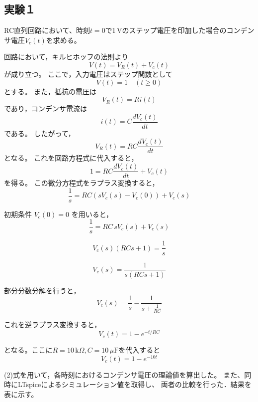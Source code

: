 \documentclass{jarticle}
\begin{document}
\subsection{実験１}

RC直列回路において、時刻$t=0$で1\,Vのステップ電圧を印加した場合のコンデンサ電圧$V_c(t)$を求める。

回路において，キルヒホッフの法則より
\[
V(t) = V_R(t) + V_c(t)
\]
が成り立つ。
ここで，入力電圧はステップ関数として
\[
V(t) = 1 \quad (t \geq 0)
\]
とする。
また，抵抗の電圧は
\[
V_R(t) = R i(t)
\]
であり，コンデンサ電流は
\[
i(t) = C \frac{dV_c(t)}{dt}
\]
である。
したがって，
\[
V_R(t) = RC \frac{dV_c(t)}{dt}
\]
となる。
これを回路方程式に代入すると，
\[
1 = RC \frac{dV_c(t)}{dt} + V_c(t)
\]
を得る。
この微分方程式をラプラス変換すると，
\[
\frac{1}{s} = RC \left(sV_c(s) - V_c(0)\right) + V_c(s)
\]

初期条件 $V_c(0)=0$ を用いると，
\[
\frac{1}{s} = RC \, s V_c(s) + V_c(s)
\]

\[
V_c(s)\left(RC s + 1\right) = \frac{1}{s}
\]

\[
V_c(s) = \frac{1}{s(RC s + 1)}
\]

部分分数分解を行うと，
\[
V_c(s) = \frac{1}{s} - \frac{1}{s + \frac{1}{RC}}
\]

これを逆ラプラス変換すると，
\[
V_c(t) = 1 - e^{-t/RC}
\]

となる。ここに$R = 10\,\text{k}\Omega, C = 10\,\mu\text{F}$を代入すると
\begin{equation}
V_c(t) = 1 - e^{-10t}    
\end{equation}

(2)式を用いて，各時刻におけるコンデンサ電圧の理論値を算出した。
また、同時にLTspiceによるシミュレーション値を取得し、
両者の比較を行った．結果を表に示す。
\end{document}
